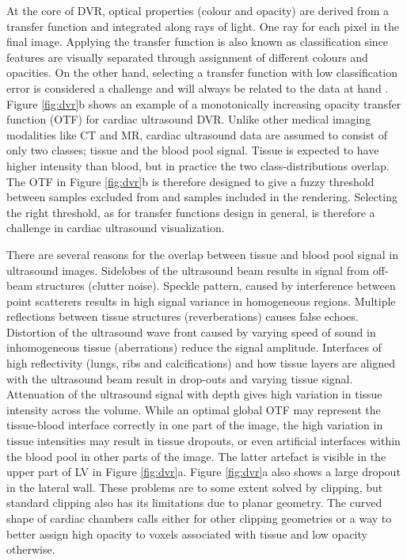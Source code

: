 At the core of DVR, optical properties (colour and opacity) are derived from a transfer function and integrated along rays of light. One ray for each pixel in the final image. Applying the transfer function is also known as classification since features are visually separated through assignment of different colours and opacities. On the other hand, selecting a transfer function with low classification error is considered a challenge and will always be related to the data at hand \cite{pfister2002transfer}. Figure \ref{fig:dvr}b shows an example of a monotonically increasing opacity transfer function (OTF) for cardiac ultrasound DVR. Unlike other medical imaging modalities like CT and MR, cardiac ultrasound data are assumed to consist of only two classes; tissue and the blood pool signal. Tissue is expected to have higher intensity than blood, but in practice the two class-distributions overlap. The OTF in Figure \ref{fig:dvr}b is therefore designed to give a fuzzy threshold between samples excluded from and samples included in the rendering. Selecting the right threshold, as for transfer functions design in general, is therefore a challenge in cardiac ultrasound visualization.   

There are several reasons for the overlap between tissue and blood pool signal in ultrasound images. Sidelobes of the ultrasound beam results in signal from off-beam structures (clutter noise). Speckle pattern, caused by interference between point scatterers results in high signal variance in homogeneous regions. Multiple reflections between tissue structures (reverberations) causes false echoes. Distortion of the ultrasound wave front caused by varying speed of sound in inhomogeneous tissue (aberrations) reduce the signal amplitude. Interfaces of high reflectivity (lungs, ribs and calcifications) and how tissue layers are aligned with the ultrasound beam result in drop-outs and varying tissue signal. Attenuation of the ultrasound signal with depth gives high variation in tissue intensity across the volume. While an optimal global OTF may represent the tissue-blood interface correctly in one part of the image, the high variation in tissue intensities may result in tissue dropouts, or even artificial interfaces within the blood pool in other parts of the image. The latter artefact is visible in the upper part of LV in Figure \ref{fig:dvr}a. Figure \ref{fig:dvr}a also shows a large dropout in the lateral wall. These problems are to some extent solved by clipping, but standard clipping also has its limitations due to planar geometry. The curved shape of cardiac chambers calls either for other clipping geometries or a way to better assign high opacity to voxels associated with tissue and low opacity otherwise\cite{patent}.

